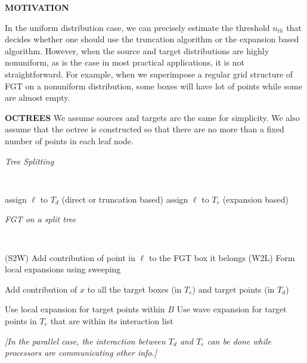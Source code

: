 {\bf MOTIVATION}

In the uniform distribution case, we can precisely estimate the threshold $n_{th}$ that decides whether one should use the truncation algorithm or the expansion based algorithm. However, when the source and target distributions are highly nonuniform, as is the case in most practical applications, it is not straightforward. For example, when we superimpose a regular grid structure of FGT on a nonuniform distribution, some boxes will have lot of points while some are almost empty. 

%

{\bf OCTREES}
We assume sources and targets are the same for simplicity. We also assume that the octree is constructed so that there are no more than a fixed number of points in each leaf node. 

\begin{algorithm}[!h]
\caption{{\em Tree Splitting}}
{\tt
\begin{algorithmic}
\STATE
      \IF {$|\ell| > \sqrt{\delta}$}
          \STATE assign $\ell$ to $T_d$ (direct or truncation based)
      \ELSE
          \STATE assign $\ell$ to $T_e$ (expansion based)
      \ENDIF
  \ENDFOR
\STATE
\end{algorithmic}
}
\end{algorithm}


\begin{algorithm}[!h]
\caption{\em FGT on a split tree}
{\tt
\begin{algorithmic}
\STATE
      \STATE (S2W) Add contribution of point in $\ell$ to the FGT box it belongs
  \ENDFOR
  \STATE
  \STATE (W2L) Form local expansions using sweeping
  \STATE 

          \STATE Add contribution of $x$ to all the target boxes (in $T_e$) and target points (in $T_d$)     
       \ENDFOR  
  \ENDFOR
  
  \STATE 
        \STATE Use local expansion for target points within $B$ 
        \STATE
        \STATE Use wave expansion for target points in $T_e$ that are within its interaction list
     \ENDFOR  
\STATE
\end{algorithmic}
}
\end{algorithm}

{\em [In the parallel case, the interaction between $T_d$ and $T_e$ can be done while processors are communicating other info.] }

